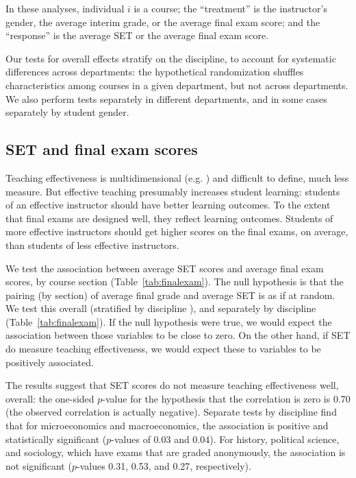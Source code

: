 \documentclass[12pt]{article}
\newcommand{\todo}[1]{{\color{red}{TO DO: \sc #1}}}
\begin{document}
In these analyses, individual $i$ is a course; the ``treatment'' is the instructor's gender, 
the average interim grade, or the average final exam score;
and the ``response'' is the average SET or the average final exam score.

Our tests for overall effects stratify on the discipline, to account for systematic
differences across departments:
the hypothetical randomization shuffles characteristics among courses in a given
department, but not across departments.
We also perform tests separately in different departments, and in some cases separately by
student gender.

\subsection{SET and final exam scores}
Teaching effectiveness is multidimensional (e.g. \citet{Marsh1997}) and difficult to define,
much less measure. 
But effective teaching presumably increases student learning:
students of an effective instructor should have better learning outcomes. 
To the extent that final exams are designed well, they reflect learning outcomes.
Students of more effective instructors should get higher scores on the final exams, on average,
than students of less effective instructors.

We test the association between average SET scores and average final exam scores, by course
section (Table~\ref{tab:finalexam}). 
The null hypothesis is that the pairing (by section)
of average final grade and average SET is as if at random.
We test this overall (stratified by discipline \todo{check this!}), and separately
by discipline (Table~\ref{tab:finalexam}).
If the null hypothesis were true, we would expect the association between those variables to be 
close to zero.
On the other hand, if SET do measure teaching effectiveness, we would expect these to 
variables to be positively associated.

The results suggest that SET scores do not measure teaching effectiveness well, overall:
the one-sided $p$-value for the hypothesis that the correlation is zero is 0.70 (the
observed correlation is actually negative). 
Separate tests by discipline find that for microeconomics and macroeconomics, the 
association is positive and statistically
significant ($p$-values of 0.03 and 0.04). 
For history, political science, and sociology, which have exams that are graded anonymously,
the association is not significant ($p$-values 0.31, 0.53, and 0.27, respectively). 
\end{document}
